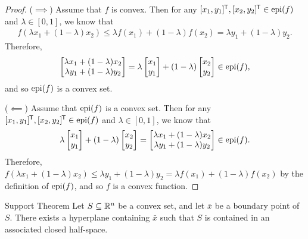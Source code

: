\begin{proof}\proofbreak
    ($\implies$) Assume that $f$ is convex. Then for any $[x_1, y_1]^{\mkern-1.5mu\mathsf{T}}, [x_2, y_2]^{\mkern-1.5mu\mathsf{T}} \in \operatorname{epi}(f)$ and $\lambda \in [0, 1]$, we know that
    \begin{align*}
        f(\lambda x_1 + (1 - \lambda)x_2) \leq \lambda f(x_1) + (1 - \lambda)f(x_2) = \lambda y_1 + (1 - \lambda)y_2.
    \end{align*}
    Therefore,
    \begin{align*}
        \begin{bmatrix}
            \lambda x_1 + (1 - \lambda)x_2 \\
            \lambda y_1 + (1 - \lambda)y_2
        \end{bmatrix} = \lambda \begin{bmatrix}
            x_1 \\ y_1
        \end{bmatrix} + (1-\lambda)\begin{bmatrix}
            x_2 \\ y_2
        \end{bmatrix} \in \operatorname{epi}(f),
    \end{align*}
    and so $\operatorname{epi}(f)$ is a convex set.

    ($\impliedby$) Assume that $\operatorname{epi}(f)$ is a convex set. Then for any $[x_1, y_1]^{\mkern-1.5mu\mathsf{T}}, [x_2, y_2]^{\mkern-1.5mu\mathsf{T}} \in \operatorname{epi}(f)$ and $\lambda \in [0, 1]$, we know that
    \begin{align*}
        \lambda \begin{bmatrix}
            x_1 \\ y_1
        \end{bmatrix} + (1-\lambda)\begin{bmatrix}
            x_2 \\ y_2
        \end{bmatrix} = \begin{bmatrix}
            \lambda x_1 + (1 - \lambda)x_2 \\
            \lambda y_1 + (1 - \lambda)y_2
        \end{bmatrix} \in \operatorname{epi}(f).
    \end{align*}
    Therefore, $f(\lambda x_1 + (1 - \lambda)x_2) \leq \lambda y_1 + (1 - \lambda)y_2 = \lambda f(x_1) + (1-\lambda)f(x_2)$ by the definition of $\operatorname{epi}(f)$, and so $f$ is a convex function.
\end{proof}

\begin{thm}{Support Theorem}\label{support-theorem}\proofbreak
    Let $S \subseteq \mathbb{R}^n$ be a convex set, and let $\bar{x}$ be a boundary point of $S$. There exists a hyperplane containing $\bar{x}$ such that $S$ is contained in an associated closed half-space.
\end{thm}

